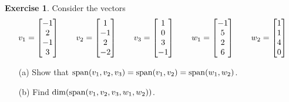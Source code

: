 \documentclass[a4paper]{amsart}
\theoremstyle{definition}
\newtheorem{exercise}{Exercise}
\begin{document}
\begin{exercise}\label{ex-dim-span}
 Consider the vectors
 \[ v_1 = \left[\begin{matrix} -1 \\  2 \\ -1 \\  3 \end{matrix}\right] \qquad
    v_2 = \left[\begin{matrix}  1 \\ -1 \\  2 \\ -2 \end{matrix}\right] \qquad
    v_3 = \left[\begin{matrix}  1 \\  0 \\  3 \\ -1 \end{matrix}\right] \qquad
    w_1 = \left[\begin{matrix} -1 \\  5 \\  2 \\  6 \end{matrix}\right] \qquad
    w_2 = \left[\begin{matrix}  1 \\  1 \\  4 \\  0 \end{matrix}\right]
 \]
 \begin{itemize}
  \item[(a)] Show that
   $\operatorname{span}(v_1,v_2,v_3)=\operatorname{span}(v_1,v_2)=\operatorname{span}(w_1,w_2)$.
  \item[(b)] Find $\dim(\operatorname{span}(v_1,v_2,v_3,w_1,w_2))$.
 \end{itemize}
\end{exercise}
\end{document}
